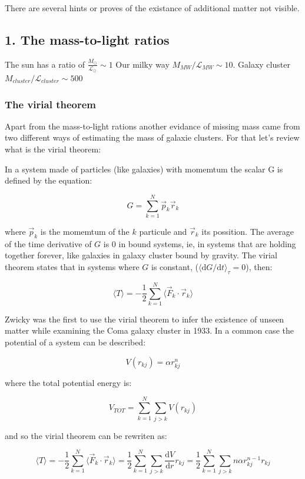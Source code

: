 \documentclass[
  letterpaper,
  DIV=11,
  numbers=noendperiod]{scrreprt}
\begin{document}
There are several hints or proves of the existance of additional matter
not visible.

\subsection{1. The mass-to-light ratios}\label{the-mass-to-light-ratios}

The sun has a ratio of \(\frac{M_{\odot}}{\mathcal{L}_{\odot}} \sim 1\)
Our milky way \(M_{MW}/\mathcal{L}_{MW} \sim 10\). Galaxy cluster
\(M_{cluster}/\mathcal{L}_{cluster} \sim 500\)

\subsubsection{The virial theorem}\label{the-virial-theorem}

Apart from the mass-to-light rations another evidance of missing mass
came from two different ways of estimating the mass of galaxie clusters.
For that let's review what is the virial theorem:

In a system made of particles (like galaxies) with momemtum the scalar G
is defined by the equation:

\[ G = \sum_{k = 1}^{N} \vec{p}_k\vec{r}_k \]

where \(\vec{p}_k\) is the momemtum of the \(k\) particule and
\(\vec{r}_k\) its possition. The average of the time derivative of \(G\)
is 0 in bound systems, ie, in systems that are holding together forever,
like galaxies in galaxy cluster bound by gravity. The virial theorem
states that in systems where \(G\) is constant,
(\(\langle \mathrm{d} G/\mathrm{d} t \rangle_\tau = 0\)), then:

\[\langle T \rangle = - \frac{1}{2} \sum^{N}_{k=1}   \langle \vec{F}_k  \cdot \vec{r}_k \rangle \]

Zwicky was the first to use the virial theorem to infer the existence of
unseen matter while examining the Coma galaxy cluster in 1933. In a
common case the potential of a system can be described:

\[V(r_{kj}) =  \alpha r_{kj}^n\]

where the total potential energy is:

\[V_{TOT} = \sum_{k = 1}^N \sum_{j > k} V (r_{kj}) \]

and so the virial theorem can be rewriten as:

\[\langle T \rangle = - \frac{1}{2} \sum^{N}_{k=1}   \langle \vec{F}_k  \cdot \vec{r}_k \rangle =  \frac{1}{2} \sum^{N}_{k=1}\sum_{j > k} \frac{\mathrm{d} V}{\mathrm{d}r} r_{kj} = \frac{1}{2} \sum^{N}_{k=1}\sum_{j > k} n \alpha r_{kj}^{n-1} r_{kj}\]
\end{document}
